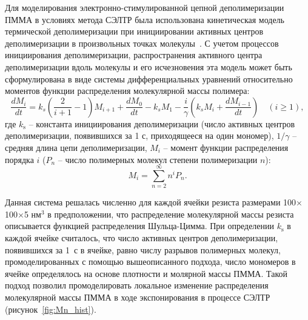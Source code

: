 Для моделирования электронно-стимулированной цепной деполимеризации ПММА в условиях метода СЭЛТР была использована кинетическая модель термической деполимеризации при инициировании активных центров деполимеризации в произвольных точках молекулы~\cite{Boyd_3}. С учетом процессов инициирования деполимеризации, распространения активного центра деполимеризации вдоль молекулы и его исчезновения эта модель может быть сформулирована в виде системы дифференциальных уравнений относительно моментов функции распределения молекулярной массы полимера:
\begin{equation} \label{eq:moment_equation}
	\frac{d M_i}{d t}=k_s\left(\frac{2}{i+1}-1\right) M_{i+1}+\frac{d M_0}{d t}-k_s M_1 - \frac{i}{\gamma}\left(k_s M_i+\frac{d M_{i-1}}{d t}\right) \quad(i \geq 1),
\end{equation}
где $k_\mathrm{s}$ -- константа инициирования деполимеризации (число активных центров деполимеризации, появившихся за 1 с, приходящееся на один мономер), $1/\gamma$ -- средняя длина цепи деполимеризации, $M_i$ -- момент функции распределения порядка $i$ ($P_n$ -- число полимерных молекул степени полимеризации $n$):
\begin{equation}
	M_i=\sum_{n=2}^{\infty} n^i P_n.
\end{equation}

Данная система решалась численно для каждой ячейки резиста размерами 100$\times$100$\times$5 нм$^3$ в предположении, что распределение молекулярной массы резиста описывается функцией распределения Шульца-Цимма. При определении $k_\mathrm{s}$ в каждой ячейке считалось, что число активных центров деполимеризации, появившихся за 1~с в ячейке, равно числу разрывов полимерных молекул, промоделированных с помощью вышеописанного подхода, число мономеров в ячейке определялось на основе плотности и молярной массы ПММА. Такой подход позволил промоделировать локальное изменение распределения молекулярной массы ПММА в ходе экспонирования в процессе СЭЛТР (рисунок~\ref{fig:Mn_hist}).

